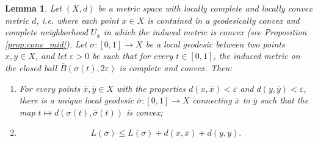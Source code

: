 \documentclass[10pt,a4paper]{amsart}
\newtheorem{lemma}{Lemma}
\newcommand{\parenum}{\setenumerate[1]{label=\textbf{(\arabic*)}}}
\begin{document}
\begin{lemma}\label{lem:induced_convex}
Let \((X,d)\) be a metric space with locally complete and locally convex metric \(d\), i.e. where each point \(x\in X\) is contained in a geodesically convex and complete neighborhood \(U_x\) in which the induced metric is convex (see Proposition \ref{prop:conv_mid}).
Let \(\sigma:[0,1]\to X\) be a local geodesic between two points \(x,y\in X\), and let \(\varepsilon>0\) be such that for every \(t\in[0,1]\), the induced metric on the closed ball \(\overline{B}(\sigma(t),2\varepsilon)\) is complete and convex.
Then:
\parenum\begin{enumerate}
    \item For every points \(\overline{x},\overline{y}\in X\) with the properties \(d(x,\overline{x})<\varepsilon\) and \(d(y,\overline{y})<\varepsilon\), there is a unique local geodesic \(\overline{\sigma}:[0,1]\to X\) connecting \(\overline{x}\) to \(\overline{y}\) such that the map \(t\mapsto d(\sigma(t),\overline{\sigma}(t))\) is convex;
    \item \[L(\overline{\sigma})\leq L(\sigma)+d(x,\overline{x})+d(y,\overline{y}).\]
\end{enumerate}
\end{lemma}
\end{document}
